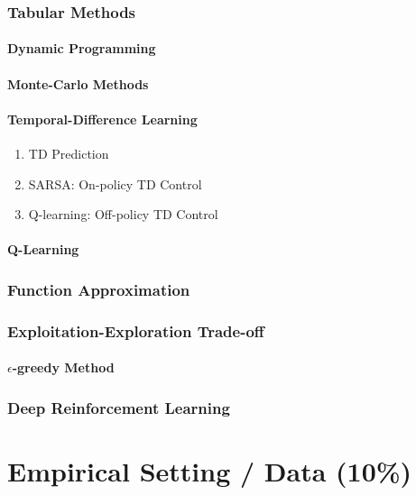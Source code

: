 \documentclass[a4paper, twoside, 12pt]{article}
\begin{document}
\subsubsection{Tabular Methods}
\label{sec:orge01239f}
\paragraph{Dynamic Programming}
\label{sec:orgac86627}
\paragraph{Monte-Carlo Methods}
\label{sec:org108aa16}
\paragraph{Temporal-Difference Learning}
\label{sec:org313e355}
\begin{enumerate}
\item TD Prediction
\label{sec:org774cc3a}
\item SARSA: On-policy TD Control
\label{sec:org04aba3d}
\item Q-learning: Off-policy TD Control
\label{sec:org5ed0e76}
\end{enumerate}
\paragraph{Q-Learning}
\label{sec:org163ee7c}
\subsubsection{Function Approximation}
\label{sec:org0c40ff9}
\subsubsection{Exploitation-Exploration Trade-off}
\label{sec:org9f94dc5}
\paragraph{\(\epsilon\)-greedy Method}
\label{sec:org401063b}
\subsubsection{Deep Reinforcement Learning}
\label{sec:org2b35354}
\section{Empirical Setting / Data (10\%)}
\label{sec:orge1637d4}
\end{document}
